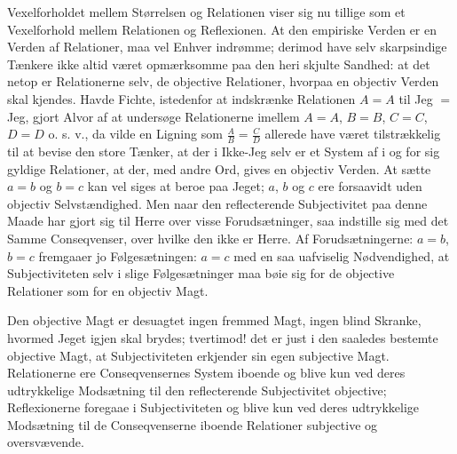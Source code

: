 \documentclass[11pt]{book}
\newcommand{\opage}[1]{\marginnote{\footnotesize\textit{[#1]}}}
\begin{document}
Vexelforholdet mellem Størrelsen og Relationen viser sig nu tillige som et Vexelforhold mellem Relationen og Reflexionen. At den empiriske Verden er en Verden af Relationer, maa vel Enhver indrømme; derimod have selv skarpsindige Tænkere ikke altid været opmærksomme paa den heri skjulte Sandhed: at det netop er Relationerne selv, de objective Relationer, hvorpaa en objectiv Verden skal kjendes. Havde Fichte, istedenfor at indskrænke Relationen $A = A$ til Jeg $=$ Jeg, gjort Alvor af at undersøge Relationerne imellem $A = A$, $B = B$, $C = C$, $D = D$ o. s. v., da vilde en Ligning som $\frac{A}{B} = \frac{C}{D}$ allerede have været tilstrækkelig til at bevise den store Tænker, at der i Ikke-Jeg selv er et System af i og for sig gyldige Relationer, at der, med andre Ord, gives en objectiv Verden. At sætte $a = b$ og $b = c$ kan vel siges at beroe paa Jeget; $a$, $b$ og $c$ ere forsaavidt uden objectiv Selvstændighed. Men naar den reflecterende Subjectivitet paa denne Maade har gjort sig til Herre over visse Forudsætninger, saa indstille sig med det Samme Conseqvenser, over hvilke den ikke er Herre. Af Forudsætningerne: $a = b$, $b = c$ fremgaaer jo Følgesætningen: $a = c$ med en saa
\opage{75} \setcounter{footnote}{0}%
uafviselig Nødvendighed, at Subjectiviteten selv i slige Følgesætninger maa bøie sig for de objective Relationer som for en objectiv Magt.

Den objective Magt er desuagtet ingen fremmed Magt, ingen blind Skranke, hvormed Jeget igjen skal brydes; tvertimod! det er just i den saaledes bestemte objective Magt, at Subjectiviteten erkjender sin egen subjective Magt. Relationerne ere Conseqvensernes System iboende og blive kun ved deres udtrykkelige Modsætning til den reflecterende Subjectivitet objective; Reflexionerne foregaae i Subjectiviteten og blive kun ved deres udtrykkelige Modsætning til de Conseqvenserne iboende Relationer subjective og oversvævende.
\end{document}
